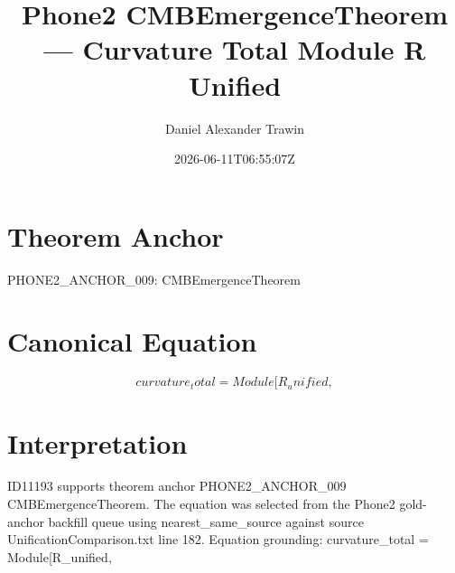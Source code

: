 \documentclass[11pt]{article}
\title{Phone2 CMBEmergenceTheorem — Curvature Total Module R Unified}
\author{Daniel Alexander Trawin}
\date{2026-06-11T06:55:07Z}
\begin{document}
\maketitle
\section*{Theorem Anchor}
PHONE2_ANCHOR_009: CMBEmergenceTheorem
\section*{Canonical Equation}
\[
curvature_total = Module[{R_unified},
\]
\section*{Interpretation}
ID11193 supports theorem anchor PHONE2_ANCHOR_009 CMBEmergenceTheorem. The equation was selected from the Phone2 gold-anchor backfill queue using nearest_same_source against source UnificationComparison.txt line 182. Equation grounding: curvature_total = Module[{R_unified},
\end{document}
